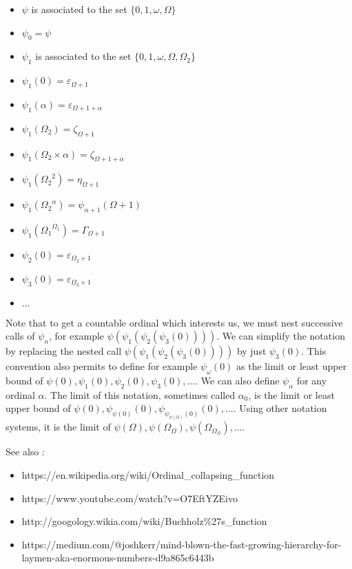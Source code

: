 \documentclass[10pt]{article}
\begin{document}
\begin{itemize}
     \setlength{\itemsep}{1pt}
     \setlength{\parskip}{0pt}
     \setlength{\parsep}{0pt}
\item \( \psi \) is associated to the set \( \lbrace 0, 1, \omega, \Omega \rbrace \)
\item \( \psi_0 = \psi \)
\item \( \psi_1 \) is associated to the set \( \lbrace 0, 1, \omega, \Omega, \Omega_2 \rbrace \)
\item \( \psi_1(0) = \varepsilon_{\Omega+1} \)
\item \( \psi_1(\alpha) = \varepsilon_{\Omega+1+\alpha} \)
\item \( \psi_1(\Omega_2) = \zeta_{\Omega+1} \)
\item \( \psi_1(\Omega_2 \times \alpha) = \zeta_{\Omega+1+\alpha} \)
\item \( \psi_1({\Omega_2}^2) = \eta_{\Omega+1} \)
\item \( \psi_1({\Omega_2}^\alpha) = \psi_{\alpha+1}(\Omega+1) \)
\item \( \psi_1({\Omega_1}^{\Omega_1}) = \Gamma_{\Omega+1} \)
\item \( \psi_2(0) = \varepsilon_{\Omega_2+1} \)
\item \( \psi_3(0) = \varepsilon_{\Omega_3+1} \)
\item \( \ldots \)
\end{itemize}

Note that to get a countable ordinal which interests us, we must nest successive calls of \( \psi_n \), for example \( \psi(\psi_1(\psi_2(\psi_3(0)))) \). We can simplify the notation by replacing the nested call \( \psi(\psi_1(\psi_2(\psi_3(0)))) \) by just \( \psi_3(0) \). This convention also permits to define for example \( \psi_\omega(0) \) as the limit or least upper bound of \( \psi(0), \psi_1(0), \psi_2(0), \psi_3(0), \ldots \). We can also define \( \psi_\alpha \) for any ordinal \( \alpha \). The limit of this notation, sometimes called \( \alpha_0 \), is the limit or least upper bound of \( \psi(0), \psi_{\psi(0)}(0), \psi_{\psi_{\psi(0)}(0)}(0), \ldots \). Using other notation systems, it is the limit of \( \psi(\Omega), \psi(\Omega_\Omega), \psi(\Omega_{\Omega_\Omega}), \ldots \).

See also :

\begin{itemize}
     \setlength{\itemsep}{1pt}
     \setlength{\parskip}{0pt}
     \setlength{\parsep}{0pt}
\item https://en.wikipedia.org/wiki/Ordinal\_collapsing\_function
\item https://www.youtube.com/watch?v=O7EftYZEivo
\item http://googology.wikia.com/wiki/Buchholz\%27s\_function
\item https://medium.com/@joshkerr/mind-blown-the-fast-growing-hierarchy-for-laymen-aka-enormous-numbers-d9a865c6443b
\end{itemize}
\end{document}

